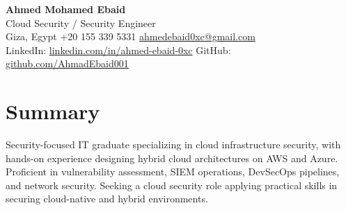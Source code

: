 \documentclass[10pt,letterpaper]{article}
\begin{document}
\begin{center}
{\LARGE\bfseries Ahmed Mohamed Ebaid}\\[0.35em]
{\normalsize Cloud Security / Security Engineer}\\[0.3em]
Giza, Egypt \textbar{} +20 155 339 5331 \textbar{}
\href{mailto:ahmedebaid0xc@gmail.com}{ahmedebaid0xc@gmail.com}\\[0.1em]
LinkedIn: \href{https://www.linkedin.com/in/ahmed-ebaid-0xc/}{linkedin.com/in/ahmed-ebaid-0xc}
\textbar{}
GitHub: \href{https://github.com/AhmadEbaid001}{github.com/AhmadEbaid001}
\end{center}
\vspace{0.2em}

\section*{Summary}
Security-focused IT graduate specializing in cloud infrastructure security, with hands-on
experience designing hybrid cloud architectures on AWS and Azure. Proficient in
vulnerability assessment, SIEM operations, DevSecOps pipelines, and network security.
Seeking a cloud security role applying practical skills in securing cloud-native and
hybrid environments.

\end{document}
